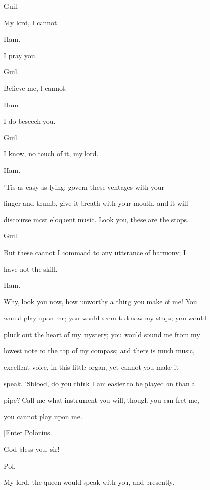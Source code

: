 \documentclass[12pt]{book}
\begin{document}
Guil.

My lord, I cannot.



Ham.

I pray you.



Guil.

Believe me, I cannot.



Ham.

I do beseech you.



Guil.

I know, no touch of it, my lord.



Ham.

'Tis as easy as lying: govern these ventages with your

finger and thumb, give it breath with your mouth, and it will

discourse most eloquent music. Look you, these are the stops.



Guil.

But these cannot I command to any utterance of harmony; I

have not the skill.



Ham.

Why, look you now, how unworthy a thing you make of me! You

would play upon me; you would seem to know my stops; you would

pluck out the heart of my mystery; you would sound me from my

lowest note to the top of my compass; and there is much music,

excellent voice, in this little organ, yet cannot you make it

speak. 'Sblood, do you think I am easier to be played on than a

pipe? Call me what instrument you will, though you can fret me,

you cannot play upon me.



[Enter Polonius.]



God bless you, sir!



Pol.

My lord, the queen would speak with you, and presently.
\end{document}
